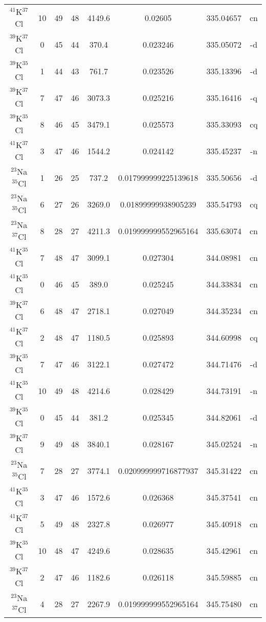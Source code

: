 \begin{table*}[htp]
\begin{tabular}{cccccccc}
$^{41}$K$^{37}$Cl & 10 & 49 & 48 & 4149.6 & 0.02605 & 335.04657 & cn \\
$^{39}$K$^{37}$Cl & 0 & 45 & 44 & 370.4 & 0.023246 & 335.05072 & -d \\
$^{39}$K$^{35}$Cl & 1 & 44 & 43 & 761.7 & 0.023526 & 335.13396 & -d \\
$^{39}$K$^{37}$Cl & 7 & 47 & 46 & 3073.3 & 0.025216 & 335.16416 & -q \\
$^{39}$K$^{35}$Cl & 8 & 46 & 45 & 3479.1 & 0.025573 & 335.33093 & cq \\
$^{41}$K$^{37}$Cl & 3 & 47 & 46 & 1544.2 & 0.024142 & 335.45237 & -n \\
$^{23}$Na$^{35}$Cl & 1 & 26 & 25 & 737.2 & 0.017999999225139618 & 335.50656 & -d \\
$^{23}$Na$^{35}$Cl & 6 & 27 & 26 & 3269.0 & 0.01899999938905239 & 335.54793 & cq \\
$^{23}$Na$^{37}$Cl & 8 & 28 & 27 & 4211.3 & 0.019999999552965164 & 335.63074 & cn \\
$^{41}$K$^{35}$Cl & 7 & 48 & 47 & 3099.1 & 0.027304 & 344.08981 & cn \\
$^{41}$K$^{35}$Cl & 0 & 46 & 45 & 389.0 & 0.025245 & 344.33834 & cn \\
$^{39}$K$^{37}$Cl & 6 & 48 & 47 & 2718.1 & 0.027049 & 344.35234 & cn \\
$^{41}$K$^{37}$Cl & 2 & 48 & 47 & 1180.5 & 0.025893 & 344.60998 & cq \\
$^{39}$K$^{35}$Cl & 7 & 47 & 46 & 3122.1 & 0.027472 & 344.71476 & -d \\
$^{41}$K$^{35}$Cl & 10 & 49 & 48 & 4214.6 & 0.028429 & 344.73191 & -n \\
$^{39}$K$^{35}$Cl & 0 & 45 & 44 & 381.2 & 0.025345 & 344.82061 & -d \\
$^{39}$K$^{37}$Cl & 9 & 49 & 48 & 3840.1 & 0.028167 & 345.02524 & -n \\
$^{23}$Na$^{35}$Cl & 7 & 28 & 27 & 3774.1 & 0.020999999716877937 & 345.31422 & cn \\
$^{41}$K$^{35}$Cl & 3 & 47 & 46 & 1572.6 & 0.026368 & 345.37541 & cn \\
$^{41}$K$^{37}$Cl & 5 & 49 & 48 & 2327.8 & 0.026977 & 345.40918 & cn \\
$^{39}$K$^{35}$Cl & 10 & 48 & 47 & 4249.6 & 0.028635 & 345.42961 & cn \\
$^{39}$K$^{37}$Cl & 2 & 47 & 46 & 1182.6 & 0.026118 & 345.59885 & cn \\
$^{23}$Na$^{37}$Cl & 4 & 28 & 27 & 2267.9 & 0.019999999552965164 & 345.75480 & cn \\

\end{tabular}
\end{table*}
